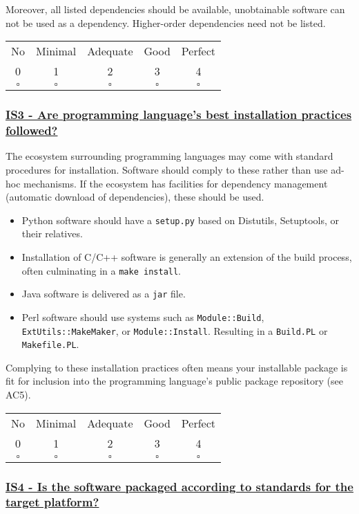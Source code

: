 \documentclass[a4paper,11pt]{article}
\newcommand{\criterion}[2]{\subsubsection*{\underline{#1 - #2}}\label{id:#1}}
\newcommand\CheckTable{%
  \begin{tabular}{ccccc}
    No & Minimal & Adequate & Good & Perfect \\
    0 & 1 & 2 & 3 & 4 \\
    \hline
    $\square$ & $\square$ & $\square$ & $\square$ & $\square$ \\
  \end{tabular}%
}
\begin{document}
Moreover, all listed dependencies should be available, unobtainable software
can not be used as a dependency. Higher-order dependencies need not be listed.
%
%

\CheckTable

\newcommand{\isThreeID}{IS3}
\newcommand{\isThreeText}{Are programming language's best installation practices followed?}
\criterion{\isThreeID}{\isThreeText}

The ecosystem surrounding programming languages may come with standard
procedures for installation. Software should comply to these rather than use
ad-hoc mechanisms. If the ecosystem has facilities for dependency management
(automatic download of dependencies), these should be used.

\begin{itemize}
 \item Python software should have a \texttt{setup.py} based on Distutils,
     Setuptools, or their relatives.
 \item Installation of C/C++ software is generally an extension of the build
     process, often culminating in a \texttt{make install}.
 \item Java software is delivered as a \texttt{jar} file.
 \item Perl software should use systems such as \texttt{Module::Build},
     \texttt{ExtUtils::MakeMaker}, or \texttt{Module::Install}. Resulting in a
     \texttt{Build.PL} or \texttt{Makefile.PL}.
\end{itemize}

Complying to these installation practices often means your installable package
is fit for inclusion into the programming language's public package repository
(see AC5).

\CheckTable

\newcommand{\isFourID}{IS4}
\newcommand{\isFourText}{Is the software packaged according to standards for the target platform?}
\criterion{\isFourID}{\isFourText}
\end{document}
